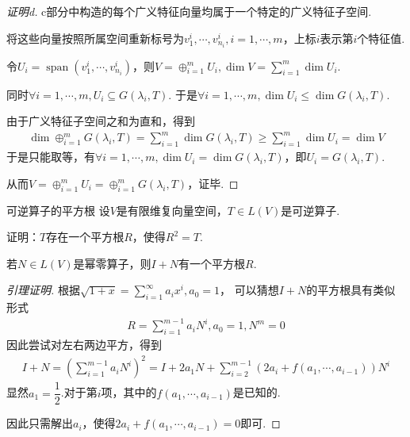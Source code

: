 \begin{proof}[证明d]
    c部分中构造的每个广义特征向量均属于一个特定的广义特征子空间.

    将这些向量按照所属空间重新标号为\(v_1^i,\cdots,v_{n_i}^i,i=1,\cdots,m\)，上标\(i\)表示第\(i\)个特征值.

    令\(U_i=\operatorname{span}(v_1^i,\cdots,v_{n_i}^i)\)，则\(V=\oplus_{i=1}^m U_i,\dim V=\sum_{i=1}^m \dim U_i\).

    同时\(\forall i=1,\cdots,m,U_i \subseteq G(\lambda_i,T)\).
    于是\(\forall i=1,\cdots,m,\dim U_i \leq \dim G(\lambda_i,T)\).

    由于广义特征子空间之和为直和，得到
    \begin{align*}
        \dim \oplus_{i=1}^m G(\lambda_i,T)=\sum_{i=1}^m \dim G(\lambda_i,T) \geq \sum_{i=1}^m \dim U_i=\dim V
    \end{align*}
    于是只能取等，有\(\forall i=1,\cdots,m,\dim U_i=\dim G(\lambda_i,T)\)，即\(U_i=G(\lambda_i,T)\).

    从而\(V=\oplus_{i=1}^m U_i=\oplus_{i=1}^m G(\lambda_i,T)\)，证毕.
\end{proof}

\newpage

\begin{problem}[8.33]\label{thm 8.33} 可逆算子的平方根 \:
    设\(V\)是有限维复向量空间，\(T \in L(V)\)是可逆算子.

    证明：\(T\)存在一个平方根\(R\)，使得\(R^2=T\).
\end{problem}

\begin{lemma}[8.31]\label{lem 8.31}
    若\(N \in L(V)\)是幂零算子，则\(I+N\)有一个平方根\(R\).
\end{lemma}

\begin{proof}[引理证明]
    根据\(\sqrt{1+x}=\sum_{i=1}^\infty a_ix^i,a_0=1\)，
    可以猜想\(I+N\)的平方根具有类似形式
    \begin{align*}
        R=\sum_{i=1}^{m-1} a_iN^i,a_0=1,N^m=0
    \end{align*}
    因此尝试对左右两边平方，得到
    \begin{align*}
        I+N = (\sum_{i=1}^{m-1} a_iN^i)^2 
            = I+2a_1N+\sum_{i=2}^{m-1} (2a_i+f(a_1,\cdots,a_{i-1}))N^i
    \end{align*}
    显然\(a_1=\dfrac{1}{2}\).对于第\(i\)项，其中的\(f(a_1,\cdots,a_{i-1})\)是已知的.
    
    因此只需解出\(a_i\)，使得\(2a_i+f(a_1,\cdots,a_{i-1})=0\)即可.
\end{proof}

